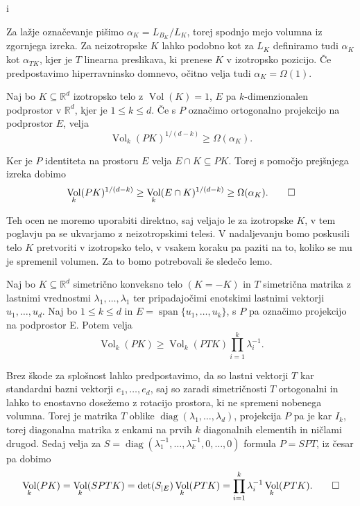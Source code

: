 i\documentclass[mat1]{fmfdelo}
\newcommand{\R}{\mathbb R}
\DeclareMathOperator{\Vol}{Vol}
\begin{document}
Za lažje označevanje pišimo $\alpha_K = L_{B_K}/L_K$, torej spodnjo mejo volumna iz zgornjega izreka. Za neizotropske $K$ lahko podobno kot za $L_K$ definiramo tudi $\alpha_K$ kot $\alpha_{TK}$, kjer je $T$ linearna preslikava, ki prenese $K$ v izotropsko pozicijo. Če predpostavimo hiperravninsko domnevo, očitno velja tudi $\alpha_K = \Omega(1)$.

\begin{posledica} \label{volalpha}
    Naj bo $K \subseteq \R^d$ izotropsko telo z $\Vol(K)=1$, $E$ pa $k$-dimenzionalen podprostor v $\R^d$, kjer je $1 \leq k \leq d$. Če s $P$ označimo ortogonalno projekcijo na podprostor $E$, velja
    \begin{equation*}
        \Vol_k(PK)^{1/(d-k)} \geq \Omega(\alpha_K).
    \end{equation*}
\end{posledica}
\begin{dokaz}
    Ker je $P$ identiteta na prostoru $E$ velja $E \cap K \subseteq PK$. Torej s pomočjo prejšnjega izreka dobimo
    \begin{equation*}
        \Vol_k(PK)^{1/(d-k)} \geq \Vol_k(E \cap K)^{1/(d-k)} \geq \Omega(\alpha_K). \qedhere
    \end{equation*}
\end{dokaz}

Teh ocen ne moremo uporabiti direktno, saj veljajo le za izotropske $K$, v tem poglavju pa se ukvarjamo z neizotropskimi telesi. V nadaljevanju bomo poskusili telo $K$ pretvoriti v izotropsko telo, v vsakem koraku pa paziti na to, koliko se mu je spremenil volumen. Za to bomo potrebovali še sledečo lemo.

\begin{lema} \label{middlet}
    Naj bo $K \subseteq \R^d$ simetrično konveksno telo $(K=-K)$ in $T$ simetrična matrika z lastnimi vrednostmi $\lambda_1,\dots,\lambda_1$ ter pripadajočimi enotskimi lastnimi vektorji $u_1,\dots,u_d$. Naj bo $1 \leq k \leq d$ in $E = \operatorname{span}\{u_1,\dots,u_k\}$, s $P$ pa označimo projekcijo na podprostor E. Potem velja
    \begin{equation*}
        \Vol_k(PK) \geq \Vol_k(PTK) \prod_{i=1}^k \lambda_i^{-1}.
    \end{equation*}
\end{lema}

\begin{dokaz}
    Brez škode za splošnost lahko predpostavimo, da so lastni vektorji $T$ kar standardni bazni vektorji $e_1,\dots,e_d$, saj so zaradi simetričnosti $T$ ortogonalni in lahko to enostavno dosežemo z rotacijo prostora, ki ne spremeni nobenega volumna. Torej je matrika $T$ oblike $\operatorname{diag}(\lambda_1,\dots,\lambda_d)$, projekcija $P$ pa je kar $I_k$, torej diagonalna matrika z enkami na prvih $k$ diagonalnih elementih in ničlami drugod. Sedaj velja za $S=\operatorname{diag}(\lambda_1^{-1},\dots,\lambda_k^{-1},0,\dots,0)$ formula $P=SPT$, iz česar pa dobimo
    \begin{equation*}
        \Vol_k(PK) = \Vol_k(SPTK) = \det(S_{|E}) \Vol_k(PTK) = \prod_{i=1}^k \lambda_i^{-1} \Vol_k(PTK). \qedhere
    \end{equation*}
\end{dokaz}
\end{document}
